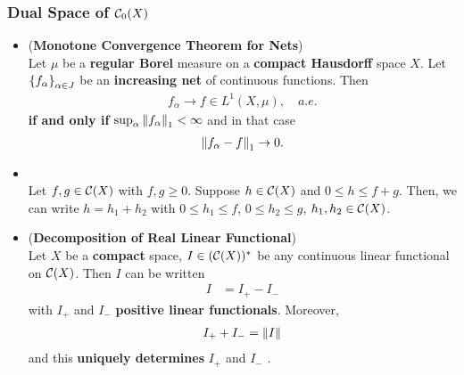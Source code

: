 \documentclass[11pt]{article}
\begin{document}
\subsubsection{Dual Space of ${\mathcal C}_0(X)$}
\begin{itemize}
\item \begin{theorem} (\textbf{Monotone Convergence Theorem for Nets}) \citep{reed1980methods}\\
Let $\mu$ be a \textbf{regular Borel} measure on a \textbf{compact Hausdorff} space $X$. Let $\left\{f_{\alpha}\right\}_{\alpha \in J}$ be an \textbf{increasing net} of continuous functions.  Then
\begin{align*}
f_{\alpha} \rightarrow f  \in L^1(X, \mu), \quad a.e.
\end{align*}  \textbf{if and only if} $\sup_{\alpha}\left\|f_{\alpha}\right\|_{1} < \infty$ and in that case
\begin{align*}
\left\|f_\alpha - f\right\|_{1} \rightarrow 0.
\end{align*}
\end{theorem}

\item \begin{lemma} \citep{reed1980methods}\\
Let $f,g \in {\mathcal C}(X)$ with $f, g \ge 0$. Suppose $h \in {\mathcal C}(X)$ and $0 \le h \le f + g$. 
Then, we can write $h = h_1 + h_2$ with $0\le h_1 \le f$, $0 \le h_2 \le g$,  $h_1, h_2 \in {\mathcal C}(X)$. 
\end{lemma}

\item \begin{theorem}  (\textbf{Decomposition of Real Linear Functional}) \citep{reed1980methods, folland2013real}\\
Let  $X$ be a \textbf{compact} space, $I \in ({\mathcal C}(X))^{*}$ be any continuous linear functional on ${\mathcal C}(X)$. Then $I$ can be written 
\begin{align*}
I &= I_{+} - I_{-}
\end{align*}
with $I_{+}$ and $I_{-}$ \textbf{positive linear functionals}. Moreover, 
\begin{align*}
I_{+} + I_{-}= \left\|I\right\|_{}
\end{align*}
and this \textbf{uniquely determines} $I_{+}$ and $I_{-}$ . 
\end{theorem}


\end{itemize}
\end{document}
